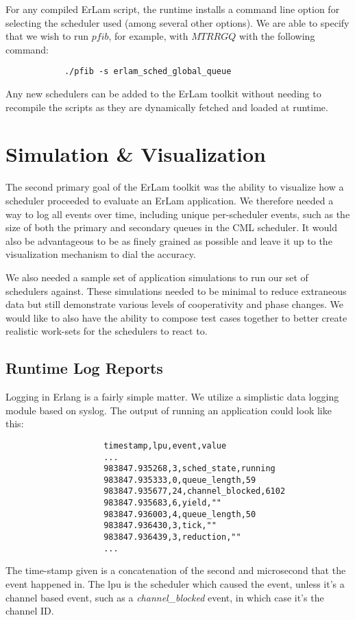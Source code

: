 For any compiled ErLam script, the runtime installs a command line option for
selecting the scheduler used (among several other options). We are able to 
specify that we wish to run $pfib$, for example, with $MTRRGQ$ with
the following command:
\begin{verbatim}
            ./pfib -s erlam_sched_global_queue 
\end{verbatim}
\noindent
Any new schedulers can be added to the ErLam toolkit without needing to 
recompile the scripts as they are dynamically fetched and loaded at runtime. 

\section{Simulation \& Visualization}\label{sec:simulation and visualization}

The second primary goal of the ErLam toolkit was the ability to visualize 
how a scheduler proceeded to evaluate an ErLam application. We therefore needed
a way to log all events over time, including unique per-scheduler events, such 
as the size of both the primary and secondary queues in the CML scheduler. It 
would also be advantageous to be as finely grained as possible and leave it up to 
the visualization mechanism to dial the accuracy.

We also needed a sample set of application simulations to run our set of 
schedulers against. These simulations needed to be minimal to reduce
extraneous data but still demonstrate various levels of cooperativity and phase 
changes. We would like to also have the ability to compose test cases 
together to better create realistic work-sets for the schedulers to react to.

\subsection{Runtime Log Reports}\label{sec:runtime log reports}

Logging in Erlang is a fairly simple matter. We utilize a simplistic data 
logging module based on syslog. The output of running an application 
could look like this:

{\footnotesize
\begin{verbatim}
                    timestamp,lpu,event,value
                    ...
                    983847.935268,3,sched_state,running
                    983847.935333,0,queue_length,59
                    983847.935677,24,channel_blocked,6102
                    983847.935683,6,yield,""
                    983847.936003,4,queue_length,50
                    983847.936430,3,tick,""
                    983847.936439,3,reduction,""
                    ...
\end{verbatim}
}
\noindent
The time-stamp given is a concatenation of the second and microsecond that the
event happened in. The lpu is the scheduler which caused the event, unless it's
a channel based event, such as a \emph{channel\_blocked} event, in which case it's
the channel ID. 

